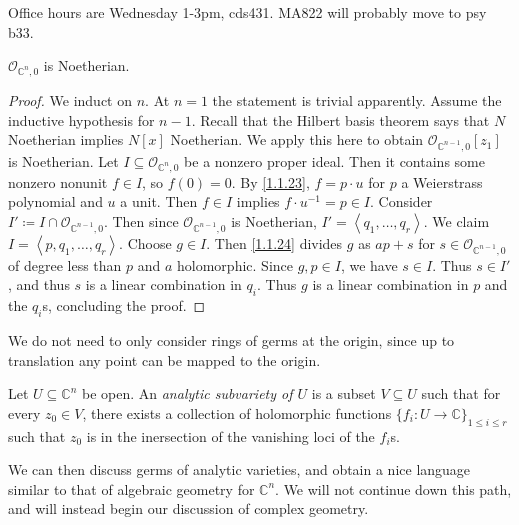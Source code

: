 
Office hours are Wednesday 1-3pm, cds431. MA822 will probably move to psy b33.

\begin{proposition}\label{1.1.28}
	$\mathcal{O} _{\mathbb{C} ^n,0} $ is Noetherian.
\end{proposition}
\begin{proof}
	We induct on $n$. At $n=1$ the statement is trivial apparently. Assume the inductive hypothesis for $n-1$. Recall that the Hilbert basis theorem says that $N$ Noetherian implies $N[x]$ Noetherian. We apply this here to obtain $\mathcal{O} _{\mathbb{C}^{n-1},0} [z_1]$ is Noetherian. Let $I\subseteq \mathcal{O} _{\mathbb{C} ^n,0} $ be a nonzero proper ideal. Then it contains some nonzero nonunit $f\in I$, so $f(0)=0$. By \cref{1.1.23}, $f=p\cdot u$ for $p$ a Weierstrass polynomial and $u$ a unit. Then $f\in I$ implies $f\cdot u^{-1} =p\in I$. Consider $I'\coloneqq I \cap \mathcal{O} _{\mathbb{C} ^{n-1} ,0} $. Then since $\mathcal{O} _{\mathbb{C} ^{n-1} ,0} $ is Noetherian, $I'=\left<q_1, \ldots ,q_r\right>$. We claim $I=\left\langle p,q_1, \ldots ,q_r \right\rangle $. Choose $g\in I$. Then \cref{1.1.24} divides $g$ as $ap+s$ for $s\in \mathcal{O}_{\mathbb{C} ^{n-1} ,0} $ of degree less than $p$ and $a$ holomorphic. Since $g,p\in I$, we have $s\in I$. Thus $s\in I'$, and thus $s$ is a linear combination in $q_i$. Thus $g$ is a linear combination in $p$ and the $q_i$s, concluding the proof.
\end{proof}

\begin{remark}\label{1.1.29}
	We do not need to only consider rings of germs at the origin, since up to translation any point can be mapped to the origin.
\end{remark}

\begin{definition}\label{1.1.30}
	Let $U\subseteq \mathbb{C} ^n$ be open. An \emph{analytic subvariety of $U$} is a subset $V\subseteq U$ such that for every $z_0\in V$, there exists a collection of holomorphic functions $\{f_i : U\to \mathbb{C}\}_{1\leq i\leq r}  $ such that $z_0$ is in the inersection of the vanishing loci of the $f_i$s.
\end{definition}

We can then discuss germs of analytic varieties, and obtain a nice language similar to that of algebraic geometry for $\mathbb{C} ^n$. We will not continue down this path, and will instead begin our discussion of complex geometry.

